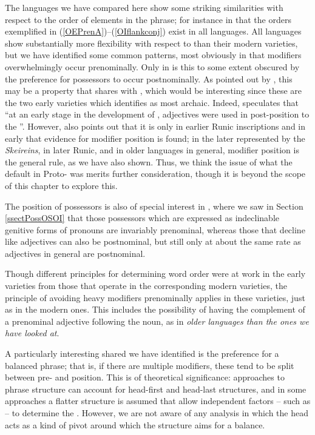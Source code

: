 \documentclass[output=paper,colorlinks,citecolor=brown,draft]{langscibook}
\begin{document}
 The languages we have compared here show some striking similarities with respect to the order of elements in the  phrase; for instance in that the orders exemplified in (\ref{OEPrenA})--(\ref{OIflankconj}) exist in all languages. All languages show substantially more flexibility with respect to  than their modern varieties, but we have identified some common patterns, most obviously in that modifiers overwhelmingly occur prenominally. Only in  is this  to some extent obscured by the preference for possessors to occur postnominally. As pointed out by \citet{ratkus2011}, this may be a property that  shares with , which would be interesting since these are the two early  varieties which \citet[30]{Lass00} identifies as most archaic. Indeed, \citet[266]{ratkus2011} speculates that “at an early stage in the development of , adjectives were used in post-position to the ''.  However, \citet[219--222]{ratkus2011} also points out that it is only in earlier Runic inscriptions and in early  that evidence for  modifier position is found; in the later  represented by the \textit{Skeireins}, in later Runic, and in older  languages in general,  modifier position is the general rule, as we have also shown. Thus, we think the issue of what the default  in Proto- was merits further consideration, though it is beyond the scope of this chapter to explore this.

The position of possessors is also of special interest in , where we saw in Section \ref{ssectPossOSOI} that those possessors which are expressed as indeclinable genitive forms of pronouns are invariably prenominal, whereas those that decline like adjectives can also be postnominal, but still only at about the same rate as adjectives in general are postnominal.

Though different principles for determining word order were at work in the early varieties from those that operate in the corresponding modern varieties, the principle of avoiding heavy modifiers prenominally applies in these varieties, just as in the modern ones. This includes the possibility of having the complement of a prenominal adjective following the noun, as in \textit{older languages than the ones we have looked at}.

A particularly interesting shared  we have identified is the preference for a balanced  phrase; that is, if there are multiple modifiers, these tend to be split between pre- and  position. This is of theoretical significance: approaches to  phrase structure can account for head-first and head-last structures, and in some approaches a flatter structure is assumed that allow independent factors -- such as  -- to determine the . However, we are not aware of any analysis in which the head  acts as a kind of pivot around which the structure aims for a balance.
\end{document}
